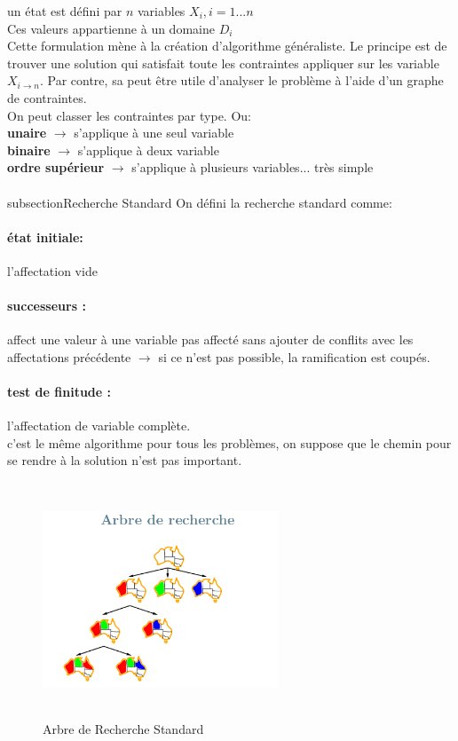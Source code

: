 \documentclass[oneside]{book}
\begin{document}
\noindent un état est défini par $n$ variables $X_i, i = 1...n$ \\
\noindent Ces valeurs appartienne à un domaine $D_i$ \\

Cette formulation mène à la création d'algorithme généraliste. Le principe est de trouver une solution qui satisfait toute les contraintes appliquer sur les variable $X_{i\rightarrow n}$. Par contre, sa peut être utile d'analyser le problème à l'aide d'un graphe de contraintes.\\

\noindent On peut classer les contraintes par type. Ou: \\
\noindent \textbf{unaire} $\rightarrow$ s'applique à une seul variable\\
\noindent \textbf{binaire} $\rightarrow$ s'applique à deux variable\\
\noindent \textbf{ordre supérieur} $\rightarrow$ s'applique à plusieurs variables... très simple\\
\\subsection{Recherche Standard}
On défini la recherche standard comme:
\noindent \paragraph{état initiale:} l'affectation vide
\noindent \paragraph{successeurs :} affect une valeur à une variable pas affecté sans ajouter de conflits avec les affectations précédente $\rightarrow$ si ce n'est pas possible, la ramification est coupés. 
\noindent \paragraph{test de finitude :} l'affectation de variable complète.\\

c'est le même algorithme pour tous les problèmes, on suppose que le chemin pour se rendre à la solution n'est pas important. 

\begin{figure}[!ht]
\centering
\includegraphics[width = 7cm, height = 7cm, keepaspectratio]{arbre_recherche_standard.png}
\caption{Arbre de Recherche Standard}
\label{fig:arbre_recherche_standard}
\end{figure}
\end{document}
